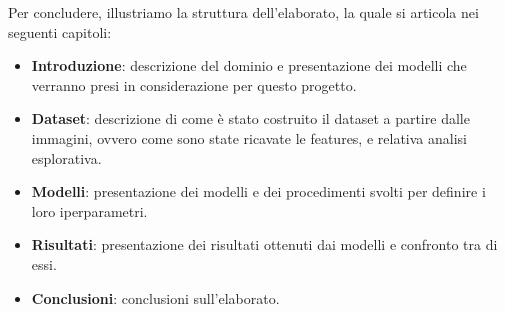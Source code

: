Per concludere, illustriamo la struttura dell'elaborato, la quale si articola
nei seguenti capitoli:
\begin{itemize}
      \item \textbf{Introduzione}: descrizione del dominio e presentazione dei
            modelli che verranno presi in considerazione per questo progetto.
      \item \textbf{Dataset}: descrizione di come è stato costruito il dataset a
            partire dalle immagini, ovvero come sono state ricavate le features, 
            e relativa analisi esplorativa.
      \item \textbf{Modelli}: presentazione dei modelli e dei procedimenti svolti 
            per definire i loro iperparametri.
      \item \textbf{Risultati}: presentazione dei risultati ottenuti dai modelli
            e confronto tra di essi.
      \item \textbf{Conclusioni}: conclusioni sull'elaborato.
\end{itemize}
